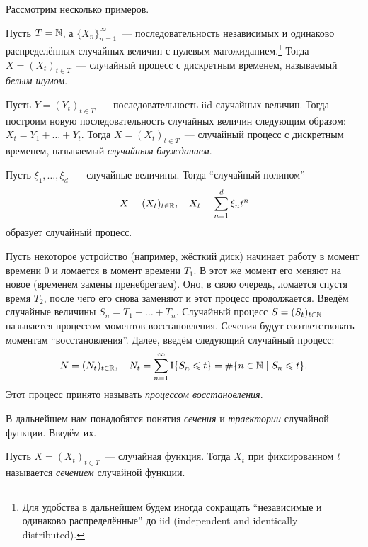 Рассмотрим несколько примеров.
\begin{example}
	Пусть \(T = \mathbb{N}\), а \(\{X_{n}\}_{n = 1}^{\infty}\)~--- последовательность 
	независимых и одинаково распределённых случайных величин с нулевым 
	матожиданием.\footnote{Для удобства в дальнейшем будем иногда сокращать 
	``независимые и одинаково распределённые'' до iid (independent and 
	identically distributed).} Тогда \(X = (X_t)_{t \in T}\)~--- случайный 
	процесс с дискретным временем, называемый \emph{белым шумом}. 
\end{example}
\begin{example}\label{random-walk}
	Пусть \(Y = (Y_t)_{t \in T}\)~--- последовательность iid случайных величин. 
	Тогда построим новую последовательность случайных величин следующим 
	образом: \(X_{t} = Y_{1} + \ldots + Y_{t}\). Тогда \(X = (X_{t})_{t \in 
	T}\)~--- случайный процесс с дискретным временем, называемый 
	\emph{случайным блужданием}. 
\end{example}
\begin{example}
	Пусть \(\xi_{1}, \ldots, \xi_{d}\)~--- случайные величины. Тогда 
	``случайный полином''
	\[
	X = (X_{t})_{t \in \mathbb{R}}, \quad X_t = \sum_{n = 1}^{d} \xi_{n}t^{n}
	\]
	образует случайный процесс.
\end{example}
\begin{example}\label{counting-process}
	Пусть некоторое устройство (например, жёсткий диск) начинает работу в 
	момент времени 0 и ломается в момент времени \(T_{1}\). В этот же момент 
	его меняют на новое (временем замены пренебрегаем). Оно, в свою очередь, 
	ломается спустя время \(T_{2}\), после чего его снова заменяют и этот 
	процесс продолжается. Введём случайные величины \(S_{n} = T_{1} + \dots + 
	T_{n}\). Случайный процесс \(S = (S_{t})_{t \in \mathbb{N}}\) называется процессом 
	моментов восстановления. Сечения будут соответствовать моментам 
	``восстановления''. Далее, введём следующий случайный процесс:
	\[
	N = (N_{t})_{t \in \mathbb{R}}, \quad N_{t} = \sum_{n = 1}^{\infty} 
	\operatorname{\mathrm{I}}\{S_{n} \leqslant t\} = \#\{n \in \mathbb{N} \mid S_{n} \leqslant t\}.
	\]
	Этот процесс принято называть \emph{процессом восстановления}.
\end{example}

В дальнейшем нам понадобятся понятия \emph{сечения} и \emph{траектории} 
случайной функции. Введём их.

\begin{definition}
	Пусть \(X = (X_{t})_{t \in T}\)~--- случайная функция. Тогда \(X_{t}\) при 
	фиксированном \(t\) называется \emph{сечением} случайной функции.
\end{definition}


